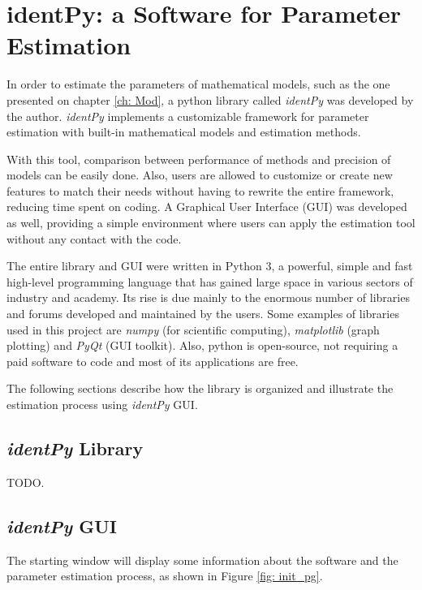 \chapter{identPy: a Software for Parameter Estimation}

\label{ch: software}

In order to estimate the parameters of mathematical models, such as the one presented on chapter \ref{ch: Mod}, a python library called \textit{identPy} was developed by the author. \textit{identPy} implements a customizable framework for parameter estimation with built-in mathematical models and estimation methods. 

With this tool, comparison between performance of methods and precision of models can be easily done. Also, users are allowed to customize or create new features to match their needs without having to rewrite the entire framework, reducing time spent on coding. A Graphical User Interface (GUI) was developed as well, providing a simple environment where users can apply the estimation tool without any contact with the code.

The entire library and GUI were written in Python 3, a powerful, simple and fast high-level programming language that has gained large space in various sectors of industry and academy. Its rise is due mainly to the enormous number of libraries and forums developed and maintained by the users. Some examples of libraries used in this project are \textit{numpy} (for scientific computing), \textit{matplotlib} (graph plotting) and \textit{PyQt} (GUI toolkit). Also, python is open-source, not requiring a paid software to code and most of its applications are free.

The following sections describe how the library is organized and illustrate the estimation process using \textit{identPy} GUI.

\section{\textit{identPy} Library}

TODO.

\section{\textit{identPy} GUI}

The starting window will display some information about the software and the parameter estimation process, as shown in Figure \ref{fig: init_pg}.

